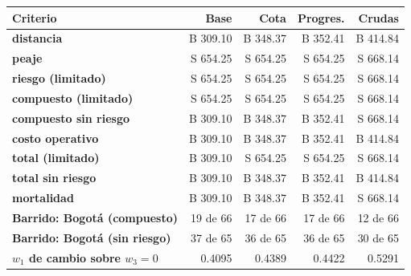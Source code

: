 \renewcommand{\arraystretch}{1.2}
\begin{tabular}{|l|r|r|r|r|}
\hline
\rowcolor{gray!20} \textbf{Criterio} & \textbf{Base} & \textbf{Cota} & \textbf{Progres.} & \textbf{Crudas} \\
\hline
\textbf{distancia} & B 309.10 & B 348.37 & B 352.41 & B 414.84 \\
\hline
\textbf{peaje} & S 654.25 & S 654.25 & S 654.25 & S 668.14 \\
\hline
\textbf{riesgo (limitado)} & S 654.25 & S 654.25 & S 654.25 & S 668.14 \\
\hline
\textbf{compuesto (limitado)} & S 654.25 & S 654.25 & S 654.25 & S 668.14 \\
\hline
\textbf{compuesto sin riesgo} & B 309.10 & B 348.37 & B 352.41 & S 668.14 \\
\hline
\textbf{costo operativo} & B 309.10 & B 348.37 & B 352.41 & B 414.84 \\
\hline
\textbf{total (limitado)} & B 309.10 & S 654.25 & S 654.25 & S 668.14 \\
\hline
\textbf{total sin riesgo} & B 309.10 & B 348.37 & B 352.41 & B 414.84 \\
\hline
\textbf{mortalidad} & B 309.10 & B 348.37 & B 352.41 & S 668.14 \\
\hline
\textbf{Barrido: Bogotá (compuesto)} & 19 de 66 & 17 de 66 & 17 de 66 & 12 de 66 \\
\hline
\textbf{Barrido: Bogotá (sin riesgo)} & 37 de 65 & 36 de 65 & 36 de 65 & 30 de 65 \\
\hline
\textbf{$w_1$ de cambio sobre $w_3=0$} & 0.4095 & 0.4389 & 0.4422 & 0.5291 \\
\hline
\end{tabular}
